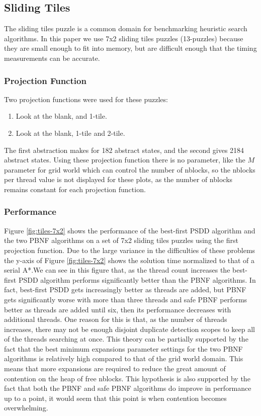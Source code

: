 \documentclass{article}
\begin{document}
 \subsection{Sliding Tiles}

 The sliding tiles puzzle is a common domain for benchmarking heuristic
 search algorithms.  In this paper we use 7x2 sliding tiles puzzles
 (13-puzzles) because they are small enough to fit into memory, but are
 difficult enough that the timing measurements can be accurate.

 \subsubsection{Projection Function}

 Two projection functions were used for these puzzles:
 \begin{enumerate}
 \item Look at the blank, and 1-tile.
 \item Look at the blank, 1-tile and 2-tile.
 \end{enumerate}
 The first abstraction makes for 182 abstract states, and the second
 gives 2184 abstract states.  Using these projection function there is
 no parameter, like the $M$ parameter for grid world which can control
 the number of nblocks, so the nblocks per thread value is not
 displayed for these plots, as the number of nblocks remains constant
 for each projection function.

 \subsubsection{Performance}

 Figure \ref{fig:tiles-7x2} shows the performance of the best-first
 PSDD algorithm and the two PBNF algorithms on a set of 7x2 sliding
 tiles puzzles using the first projection function.  Due to the large
 variance in the difficulties of these problems the y-axis of Figure
 \ref{fig:tiles-7x2} shows the solution time normalized to that of a
 serial A*.We can see in this figure that, as the thread count
 increases the best-first PSDD algorithm performs significantly better
 than the PBNF algorithms.  In fact, best-first PSDD gets increasingly
 better as threads are added, but PBNF gets significantly worse with
 more than three threads and safe PBNF performs better as threads are
 added until six, then its performance decreases with additional
 threads.  One reason for this is that, as the number of threads
 increases, there may not be enough disjoint duplicate detection scopes
 to keep all of the threads searching at once.  This theory can be
 partially supported by the fact that the best minimum expansions
 parameter settings for the two PBNF algorithms is relatively high
 compared to that of the grid world domain.  This means that more
 expansions are required to reduce the great amount of contention on
 the heap of free nblocks.  This hypothesis is also supported by the
 fact that both the PBNF and safe PBNF algorithms do improve in
 performance up to a point, it would seem that this point is when
 contention becomes overwhelming.
\end{document}
